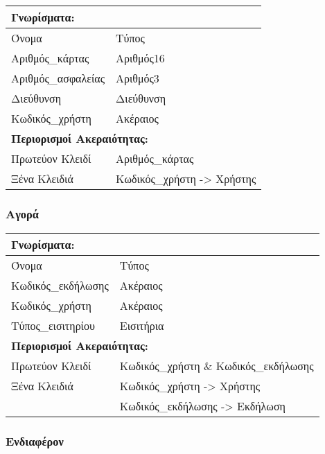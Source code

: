 \begin{tabular}{|p{6cm}|p{8cm}|}
  \multicolumn{2}{l}{\textbf{Γνωρίσματα:}}               \\ \hline
  Όνομα              & Τύπος                             \\ \hline
  Αριθμός\_κάρτας    & Αριθμός16                         \\ \hline
  Αριθμός\_ασφαλείας & Αριθμός3                          \\ \hline
  Διεύθυνση          & Διεύθυνση                         \\ \hline
  Κωδικός\_χρήστη    & Ακέραιος                          \\ \hline
  \multicolumn{2}{l}{\textbf{Περιορισμοί Ακεραιότητας:}} \\ \hline
  Πρωτεύον Κλειδί    & Αριθμός\_κάρτας                   \\ \hline
  Ξένα Κλειδιά       & Κωδικός\_χρήστη -> Χρήστης        \\ \hline
\end{tabular}

\subsubsection*{Αγορά}

\begin{tabular}{|p{6cm}|p{8cm}|}
  \multicolumn{2}{l}{\textbf{Γνωρίσματα:}}                   \\ \hline
  Όνομα              & Τύπος                                 \\ \hline
  Κωδικός\_εκδήλωσης & Ακέραιος                              \\ \hline
  Κωδικός\_χρήστη    & Ακέραιος                              \\ \hline
  Τύπος\_εισιτηρίου  & Εισιτήρια                             \\ \hline
  \multicolumn{2}{l}{\textbf{Περιορισμοί Ακεραιότητας:}}     \\ \hline
  Πρωτεύον Κλειδί    & Κωδικός\_χρήστη \& Κωδικός\_εκδήλωσης \\ \hline
  Ξένα Κλειδιά       & Κωδικός\_χρήστη -> Χρήστης            \\ \hline
                     & Κωδικός\_εκδήλωσης -> Εκδήλωση        \\ \hline
\end{tabular}

\subsubsection*{Ενδιαφέρον}

